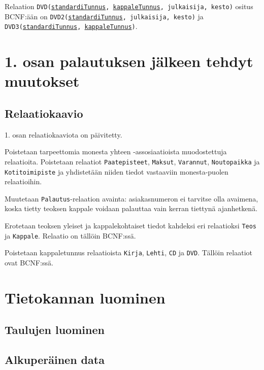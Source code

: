 \documentclass[12pt,titlepage] {article}
\begin{document}
Relaation \texttt{DVD(\underline{standardiTunnus}, \underline{kappaleTunnus}, julkaisija, kesto)} ositus BCNF:ään on \texttt{DVD2(\underline{standardiTunnus}, julkaisija, kesto)} ja \texttt{DVD3(\underline{standardiTunnus}, \underline{kappaleTunnus})}.

\section {1. osan palautuksen jälkeen tehdyt muutokset}

\subsection {Relaatiokaavio}

1. osan relaatiokaaviota on päivitetty.

Poistetaan tarpeettomia monesta yhteen -assosiaatioista muodostettuja relaatioita. Poistetaan relaatiot \texttt{Paatepisteet}, \texttt{Maksut}, \texttt{Varannut}, \texttt{Noutopaikka} ja \texttt{Kotitoimipiste} ja yhdistetään niiden tiedot vastaaviin monesta-puolen relaatioihin.

Muutetaan \texttt{Palautus}-relaation avainta: asiakasnumeron ei tarvitse olla avaimena, koska tietty teoksen kappale voidaan palauttaa vain kerran tiettynä ajanhetkenä.

Erotetaan teoksen yleiset ja kappalekohtaiset tiedot kahdeksi eri relaatioksi \texttt{Teos} ja \texttt{Kappale}. Relaatio on tällöin BCNF:ssä.

Poistetaan kappaletunnus relaatioista \texttt{Kirja}, \texttt{Lehti}, \texttt{CD} ja \texttt{DVD}. Tällöin relaatiot ovat BCNF:ssä.

\section {Tietokannan luominen}

\subsection {Taulujen luominen}



\subsection {Alkuperäinen data}


\end{document}
